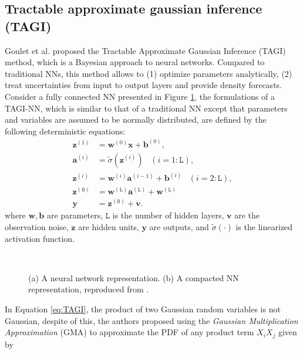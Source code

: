 \documentclass{article}
\begin{document}
\subsection{Tractable approximate gaussian inference (TAGI)}\label{sub:tagi}
Goulet et al. \cite{goulet2020tractable} proposed the Tractable Approximate Gaussian Inference (TAGI) method, which is a Bayesian approach to neural networks. Compared to traditional NNs, this method allows to (1) optimize parameters analytically, (2) treat uncertainties from input to output layers and provide density forecasts. \\
Consider a fully connected NN presented in Figure \ref{fig:FNN},
the formulations of a TAGI-NN, which is similar to that of a traditional NN except that parameters and variables are assumed to be normally distributed, are defined by the following deterministic equations:
\begin{equation*} \label{eq:TAGI}
\begin{split}
    \bm{z}^{(1)} &= \bm{w}^{(0)} \bm{x} + \bm{b}^{(0)}, \\
    \bm{a}^{(i)} &= \tilde{\sigma}(\bm{z}^{(i)}) \; \; \;(i=1:\mathtt{L}), \\
    \bm{z}^{(i)} &= \bm{w}^{(i)} \bm{a}^{(i-1)} + \bm{b}^{(i)} \; \; \;(i=2:\mathtt{L}), \\
    \bm{z}^{(\mathtt{O})} &=  \bm{w}^{(\mathtt{L})} \bm{a}^{(\mathtt{L})} + \bm{w}^{(\mathtt{L})} \\
    \bm{y} &=  \bm{z}^{(\mathtt{O})} + \bm{v}.
\end{split}
\end{equation*}
where $\bm{w},\bm{b}$ are parameters, $\mathtt{L}$ is the number of hidden layers, $\bm{v}$ are the observation noise, $\bm{z}$ are hidden units, $\bm{y}$ are outputs, and $\tilde{\sigma}(\cdot)$ is the linearized activation function.
\begin{figure}[htbp]
\centering
\subfigure[]{\resizebox{0.9\linewidth}{!}{}}\\
\subfigure[]{\resizebox{0.9
\linewidth}{!}{}}
\caption{(a) A neural network representation. (b) A compacted NN representation, reproduced from \cite{goulet2020tractable}.}
\label{fig:FNN}
\end{figure}

In Equation \ref{eq:TAGI}, the product of two Gaussian random variables is not Gaussian, despite of this, the authors proposed using the \textit{Gaussian Multiplication Approximation} (GMA) to approximate the PDF of any product term $X_iX_j$ given by
%
\end{document}
